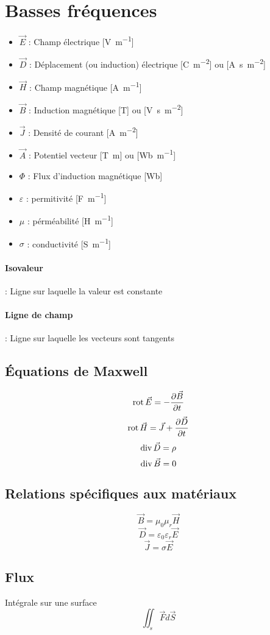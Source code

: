 \documentclass[resume]{subfiles}
\begin{document}
\section{Basses fréquences}
\begin{itemize}
\item $\vec{E}$ : Champ électrique [\si{\volt\per\meter}]
\item $\vec{D}$ : Déplacement (ou induction) électrique [\si{\coulomb\per\square\meter}] ou [\si{\ampere\second\per\square\meter}]
\item $\vec{H}$ : Champ magnétique [\si{\ampere\per\meter}]
\item $\vec{B}$ : Induction magnétique [\si{\tesla}] ou [\si{\volt\second\per\square\meter}]
\item $\vec{J}$ : Densité de courant [\si{\ampere\per\square\meter}]
\item $\vec{A}$ : Potentiel vecteur [\si{\tesla\meter}] ou [\si{\weber\per\meter}]
\item $\Phi$ : Flux d'induction magnétique [\si{\weber}]
\item $\varepsilon$ : permitivité [\si{\farad\per\meter}]
\item $\mu$ : pérméabilité [\si{\henry\per\meter}]
\item $\sigma$ : conductivité [\si{\siemens\per\meter}]
\end{itemize}
\paragraph{Isovaleur} : Ligne sur laquelle la valeur est constante
\paragraph{Ligne de champ} : Ligne sur laquelle les vecteurs sont tangents
\subsection{Équations de Maxwell}
$$\operatorname{rot}\vec{E}=-\frac{\partial \vec{B}}{\partial t}$$
$$\operatorname{rot}\vec{H}=\vec{J}+\frac{\partial \vec{D}}{\partial t}$$
$$\operatorname{div}\vec{D}=\rho$$
$$\operatorname{div}\vec{B}=0$$
\subsection{Relations spécifiques aux matériaux}
$$\vec{B}=\mu_0\mu_r\vec{H}$$
$$\vec{D}=\varepsilon_0\varepsilon_r\vec{E}$$
$$\vec{J}=\sigma\vec{E}$$
\subsection{Flux}
Intégrale sur une surface
$$\iint_s\vec{F}d\vec{S}$$
\end{document}
